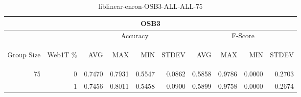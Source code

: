 \begin{center}
\begin{table}[htbp]
\begin{tabular}{ | r | r | r | r | r | r | r | r | r | r |}
\hline
\multicolumn{10}{|c|}{OSB3}\\
\hline
 & & \multicolumn{4}{|c|}{Accuracy} & \multicolumn{4}{|c|}{F-Score}\\ \cline{3-10}
\begin{sideways}Group Size\end{sideways} & \begin{sideways}Web1T \%\end{sideways} & \begin{sideways}AVG\end{sideways} & \begin{sideways}MAX\end{sideways} & \begin{sideways}MIN\end{sideways} & \begin{sideways}STDEV\end{sideways} & \begin{sideways}AVG\end{sideways} & \begin{sideways}MAX\end{sideways} & \begin{sideways}MIN\end{sideways} & \begin{sideways}STDEV\end{sideways}\\
\hline
\multirow{2}{*}{75}
 & 0 & 0.7470 & 0.7931 & 0.5547 & 0.0862 & 0.5858 & 0.9786 & 0.0000 & 0.2703\\ \cline{2-10}
 & 1 & 0.7456 & 0.8011 & 0.5458 & 0.0900 & 0.5899 & 0.9758 & 0.0000 & 0.2674\\ \cline{2-10}
\hline
\end{tabular}
\caption{liblinear-enron-OSB3-ALL-ALL-75}
\end{table}
\end{center}

